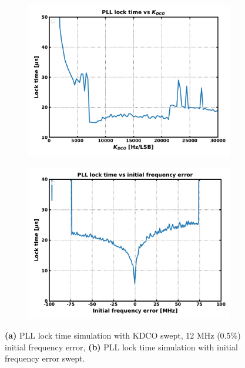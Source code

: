 	\begin{figure}[htb!]
	    \centering
	    \begin{subfigure}{0.5\textwidth}
	        \centering
	        \center\includegraphics[width=1.0\textwidth, angle=0]{figs/_kdco_sweep.pdf}
	        \caption{ }
	        \label{fig:sweep_kdco}
	    \end{subfigure}%
	    \begin{subfigure}{0.5\textwidth}
	        \centering
	        \center\includegraphics[width=1.0\textwidth, angle=0]{figs/_finit_sweep.pdf}
	        \caption{ }
	        \label{fig:sweep_finit}
	    \end{subfigure}
	    \label{fig:sweep_sim}
	    \caption{\textbf{(a)} PLL lock time simulation with KDCO swept, 12 MHz (0.5\%) initial frequency error, \textbf{(b)} PLL lock time simulation with initial frequency error swept.}
	\end{figure}

